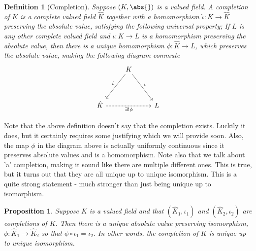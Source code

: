 \documentclass{article}
\newtheorem{definition}{Definition}[section]
\newtheorem{proposition}{Proposition}[section]
\numberwithin{equation}{section}
\begin{document}
\begin{definition}[Completion]\label{def: Completion}
	Suppose $(K, \abs{})$ is a valued field. A completion of $K$ is a complete valued field $\hat K$ together with a homomorphism $\hat \iota : K \to \hat K$ preserving the absolute value, satisfying the following universal property; If $L$ is any other complete valued field and $\iota : K \to L$ is a homomorphism preserving the absolute value, then there is a unique homomorphism $\phi : \hat K \to L$, which preserves the absolute value, making the following diagram commute
	\[\begin{tikzcd}
        	& K \\
        	\\
        	\hat K && L
        	\arrow["{\exists! \phi}"', dashed, from=3-1, to=3-3]
        	\arrow["{\hat \iota}"', from=1-2, to=3-1]
        	\arrow["{\iota}", from=1-2, to=3-3]
    	\end{tikzcd}\]
\end{definition}
Note that the above definition doesn't say that the completion exists. Luckily it does, but it certainly requires some justifying which we will provide soon. Also, the map $\phi$ in the diagram above is actually uniformly continuous since it preserves absolute values and is a homomorphism. Note also that we talk about 'a' completion, making it sound like there are multiple different ones. This is true, but it turns out that they are all unique up to unique isomorphism. This is a quite strong statement - much stronger than just being unique up to isomorphism. 




\begin{proposition}
	Suppose $K$ is a valued field and that $(\hat K_1, \iota_1)$ and $(\hat K_2, \iota_2)$ are completions of $K$. Then there is a unique absolute value preserving isomorphism, $\phi : \hat K_1 \to \hat K_2$ so that $\phi \circ \iota_1 = \iota_2$. In other words, the completion of $K$ is unique up to unique isomorphism.
\end{proposition}
\end{document}
